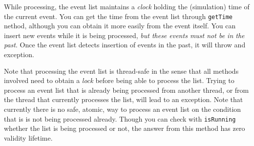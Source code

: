While processing, the event list maintains a {\em clock}
  holding the (simulation) time of the current event.
You can get the time from the event list through \lstinline{getTime} nethod,
  although you can obtain it more easily from the event itself.
You can insert new events while it is being processed,
  {\em but these events must not be in the past}.
Once the event list detects insertion of events in the past,
  it will throw and exception.

Note that processing the event list
  is thread-safe in the sense that all methods involved
  need to obtain a {\em lock} before being able to process the list.
Trying to process an event list that is already being processed
  from another thread,
  or from the thread that currently processes the list,
  will lead to an exception.
Note that currently there is no safe, atomic, way
  to process an event list on the condition that is
  is not being processed already.
Though you can check with \lstinline{isRunning}
  whether the list is being processed or not,
  the answer from this method has zero validity lifetime.


